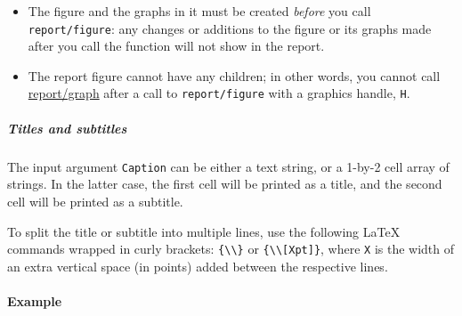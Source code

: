  \begin{itemize}
 \item
   The figure and the graphs in it must be created \emph{before} you call
   \texttt{report/figure}: any changes or additions to the figure or its
   graphs made after you call the function will not show in the report.
 \item
   The report figure cannot have any children; in other words, you cannot
   call \url{report/graph} after a call to \texttt{report/figure} with a
   graphics handle, \texttt{H}.
 \end{itemize}
 
 \subparagraph{Titles and subtitles}
 
 The input argument \texttt{Caption} can be either a text string, or a
 1-by-2 cell array of strings. In the latter case, the first cell will be
 printed as a title, and the second cell will be printed as a subtitle.
 
 To split the title or subtitle into multiple lines, use the following
 LaTeX commands wrapped in curly brackets:
 \texttt{\{\textbackslash{}\textbackslash{}\}} or
 \texttt{\{\textbackslash{}\textbackslash{}{[}Xpt{]}\}}, where \texttt{X}
 is the width of an extra vertical space (in points) added between the
 respective lines.
 
 \paragraph{Example}



